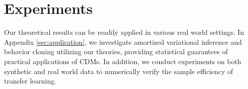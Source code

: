 \documentclass{article}
\numberwithin{equation}{section}
\theoremstyle{definition}
\begin{document}
\section{Experiments}\label{sec:exp}

Our theoretical results can be readily applied in various real world settings. In Appendix \ref{sec:application}, we investigate amortized variational inference and behavior cloning utilizing our theories, providing statistical guarantees of practical applications of CDMs.
In addition, we conduct experiments on both synthetic and real world data to numerically verify the sample efficiency of transfer learning.

\begin{table}[t]
    \centering
    \begin{minipage}{0.47\textwidth}
        \centering
        \caption{MSEs for $\beta_0=5.5$.}
        \label{tab:beta=5.5}
    \end{minipage}
    \hfill
    \begin{minipage}{0.47\textwidth}
        \centering
        \caption{MSEs for $\beta_0=15$.}
        \label{tab:beta=15}
    \end{minipage}
\end{table}
\end{document}
